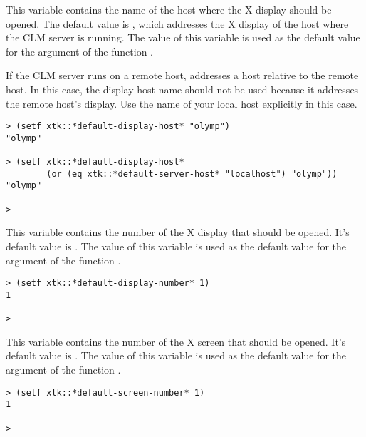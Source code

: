 \begin{lispd}
\beschr This variable contains the name of the host where the X display should
be opened.  The default value is , which addresses the X
display
of the host where the CLM server is running.  The value of this variable is
used as the default value for the  argument of the function
. 

If the CLM server runs on a remote host, 
addresses a host relative to the remote host. In this case, the display host
name  should not be used because it addresses the remote
host's display. Use the name of your local host explicitly in this case.

\beispiel \begin{verbatim}
> (setf xtk::*default-display-host* "olymp")
"olymp"

> (setf xtk::*default-display-host* 
        (or (eq xtk::*default-server-host* "localhost") "olymp"))
"olymp"

>
\end{verbatim}
\end{lispd}

\begin{lispd}
\beschr This variable contains the number of the X display that should
be opened.  It's default value is . The value of this variable is
used as the default value for the  argument of the function
. 

\beispiel \begin{verbatim}
> (setf xtk::*default-display-number* 1)
1

>
\end{verbatim}
\end{lispd}

\begin{lispd}
\beschr This variable contains the number of the X screen that should
be opened.  It's default value is . The value of this variable is
used as the default value for the  argument of the function
. 

\beispiel \begin{verbatim}
> (setf xtk::*default-screen-number* 1)
1

>
\end{verbatim}
\end{lispd}

